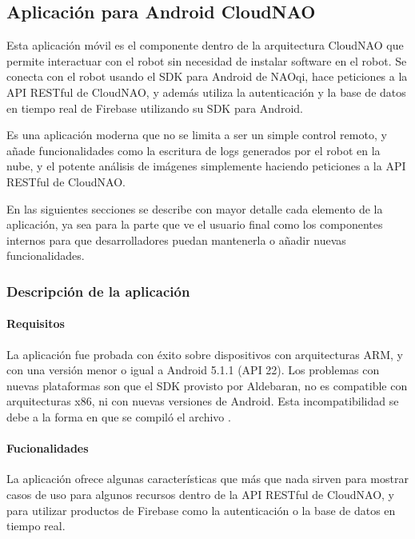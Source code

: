 \subsection{Aplicación para Android CloudNAO}
\label{\detokenize{introduction:welcome-to-cloudnao-android-s-documentation}}
Esta aplicación móvil es el componente dentro de la arquitectura CloudNAO
que permite interactuar con el robot sin necesidad de instalar software en el
robot. Se conecta con el robot usando el SDK para Android de NAOqi, hace peticiones
a la API RESTful de CloudNAO, y además utiliza la autenticación
y la base de datos en tiempo real de Firebase utilizando su SDK para Android.

Es una aplicación moderna que no se limita a ser un simple control remoto, y
añade funcionalidades como la escritura de logs generados por el robot en la nube,
y el potente análisis de imágenes simplemente haciendo peticiones a la API
RESTful de CloudNAO.

En las siguientes secciones se describe con mayor detalle cada elemento de la
aplicación, ya sea para la parte que ve el usuario final como los componentes
internos para que desarrolladores puedan mantenerla o añadir nuevas
funcionalidades.


\subsubsection{Descripción de la aplicación}
\label{\detokenize{users_docs::doc}}\label{\detokenize{users_docs:descripcion-de-la-aplicacion}}

\paragraph{Requisitos}
\label{\detokenize{users_docs:requisitos}}
La aplicación fue probada con éxito sobre dispositivos con arquitecturas ARM,
y con una versión menor o igual a Android 5.1.1 (API 22). Los problemas con
nuevas plataformas son que el SDK provisto por Aldebaran, no es compatible con
arquitecturas x86, ni con nuevas versiones de Android. Esta incompatibilidad
se debe a la forma en que se compiló el archivo
.


\paragraph{Fucionalidades}
\label{\detokenize{users_docs:fucionalidades}}
La aplicación ofrece algunas características que más que nada sirven para
mostrar casos de uso para algunos recursos dentro de la API RESTful
de CloudNAO, y para utilizar productos de Firebase como la autenticación
o la base de datos en tiempo real.

